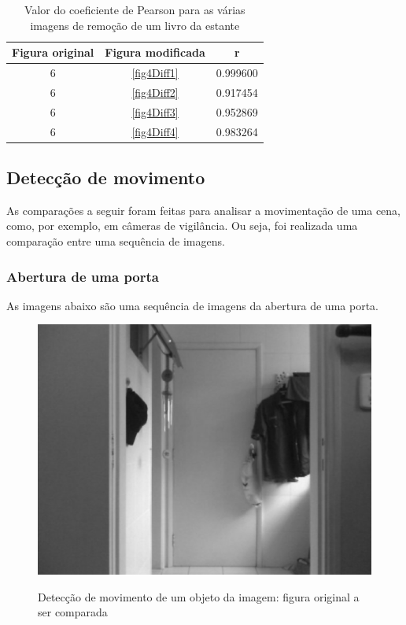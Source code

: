 \documentclass[10pt,a4paper]{article}
\begin{document}
\vspace{-1.0cm}
\begin{table}[h!]
  \begin{center}
    \caption{Valor do coeficiente de Pearson para as várias imagens de
      remoção de um livro da estante}
    \begin{tabular}{|c|c|c|}
      \hline
      Figura original & Figura modificada & r\\
      \hline
      6 &  \ref{fig4Diff1} & 0.999600\\
      6 &  \ref{fig4Diff2} &  0.917454\\
      6 &  \ref{fig4Diff3} &   0.952869\\
      6 &  \ref{fig4Diff4} &   0.983264\\
      \hline
    \end{tabular}\label{tab:livro}
  \end{center}
\end{table}


\newpage
\subsection{Detecção de movimento}
As comparações a seguir foram feitas para analisar a movimentação de uma cena, como, por exemplo, em câmeras de
vigilância. Ou seja, foi realizada uma comparação entre uma sequência de imagens.

\subsubsection{Abertura de uma porta}
As imagens abaixo são uma sequência de imagens da
abertura de uma porta.

\begin{figure}[h!]
  \begin{center}
    \includegraphics[scale=0.35]{photos/porta/gBase} \label{porta}
    \caption{Detecção de movimento de um objeto da imagem: figura original a ser comparada}
  \end{center}
\end{figure}
\end{document}
